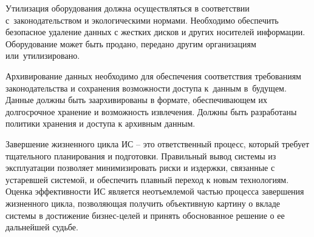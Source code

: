 \documentclass{ou}
\begin{document}
Утилизация оборудования должна осуществляться в соответствии с~законодательством и экологическими нормами. Необходимо обеспечить безопасное удаление данных с жестких дисков и других носителей информации. Оборудование может быть продано, передано другим организациям или~утилизировано.

Архивирование данных необходимо для обеспечения соответствия требованиям законодательства и сохранения возможности доступа к~данным в~будущем. Данные должны быть заархивированы в формате, обеспечивающем их долгосрочное хранение и возможность извлечения. Должны быть разработаны политики хранения и доступа к архивным данным.

Завершение жизненного цикла ИС -- это ответственный процесс, который требует тщательного планирования и подготовки. Правильный вывод системы из эксплуатации позволяет минимизировать риски и издержки, связанные с устаревшей системой, и обеспечить плавный переход к новым технологиям. Оценка эффективности ИС является неотъемлемой частью процесса завершения жизненного цикла, позволяющая получить объективную картину о вкладе системы в достижение бизнес-целей и принять обоснованное решение о ее дальнейшей судьбе.
\newpage
{
\sloppy
\nocite{*}
\cleardoublepage
{}


}
\end{document}
